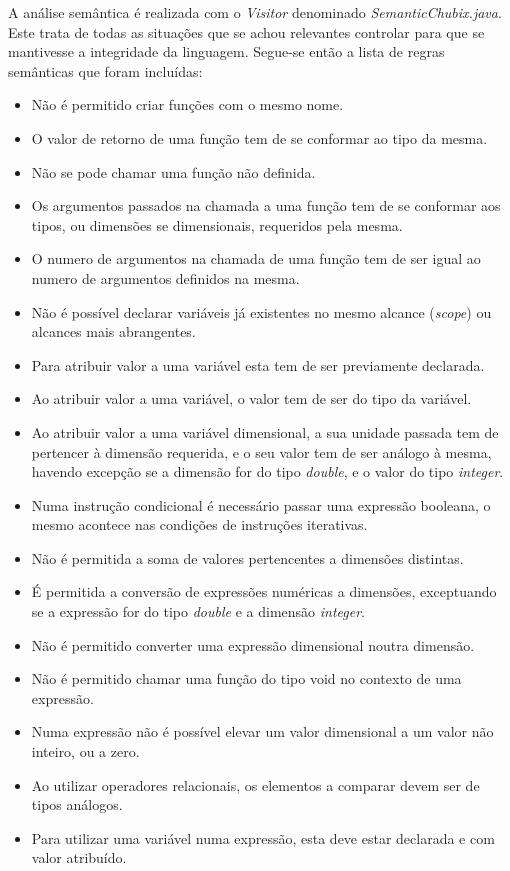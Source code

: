 \documentclass[10pt,portuguese]{article}
\begin{document}
\par A análise semântica é realizada com o \emph{Visitor} denominado \emph{SemanticChubix.java}. Este trata de todas as situações que se achou relevantes controlar para que se mantivesse a integridade da linguagem. Segue-se então a lista de regras semânticas que foram incluídas:
\begin{itemize}
    \item Não é permitido criar funções com o mesmo nome.
    \item O valor de retorno de uma função tem de se conformar ao tipo da mesma.
    \item Não se pode chamar uma função não definida.
    \item Os argumentos passados na chamada a uma função tem de se conformar aos tipos, ou dimensões se dimensionais, requeridos pela mesma.
    \item O numero de argumentos na chamada de uma função tem de ser igual ao numero de argumentos definidos na mesma.
    \item Não é possível declarar variáveis já existentes no mesmo alcance (\emph{scope}) ou alcances mais abrangentes.
    \item Para atribuir valor a uma variável esta tem de ser previamente declarada.
    \item Ao atribuir valor a uma variável, o valor tem de ser do tipo da variável.
    \item Ao atribuir valor a uma variável dimensional, a sua unidade passada tem de pertencer à dimensão requerida, e o seu valor tem de ser análogo à mesma, havendo excepção se a dimensão for do tipo \emph{double}, e o valor do tipo \emph{integer}.
    \item Numa instrução condicional é necessário passar uma expressão booleana, o mesmo acontece nas condições de instruções iterativas.
    \item Não é permitida a soma de valores pertencentes a dimensões distintas.
    \item É permitida a conversão de expressões numéricas a dimensões, exceptuando se a expressão for do tipo \emph{double} e a dimensão \emph{integer}. 
    \item Não é permitido converter uma expressão dimensional noutra dimensão.
    \item Não é permitido chamar uma função do tipo void no contexto de uma expressão.
    \item Numa expressão não é possível elevar um valor dimensional a um valor não inteiro, ou a zero.
    \item Ao utilizar operadores relacionais, os elementos a comparar devem ser de tipos análogos.
    \item Para utilizar uma variável numa expressão, esta deve estar declarada e com valor atribuído.
\end{itemize}
\end{document}
